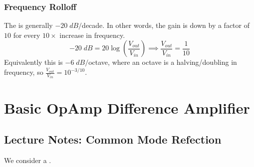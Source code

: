 \documentclass[12pt, a4paper, oneside, openright, titlepage]{book}
\begin{document}
\subsection{Frequency Rolloff}

The  is generally $-20\;dB/$decade. In other words, the gain is down by a factor of $10$ for every $10\times$ increase in frequency. \begin{equation*}
    -20\;dB = 20\log\left(\frac{V_{out}}{V_{in}}\right) \implies \frac{V_{out}}{V_{in}} = \frac{1}{10}
\end{equation*}
Equivalently this is $-6\;dB/$octave, where an octave is a halving/doubling in frequency, so $\frac{V_{out}}{V_{in}} = 10^{-3/10}$.




\chapter{Basic OpAmp Difference Amplifier}

\section{Lecture Notes: Common Mode Refection}

We consider a .
\end{document}
